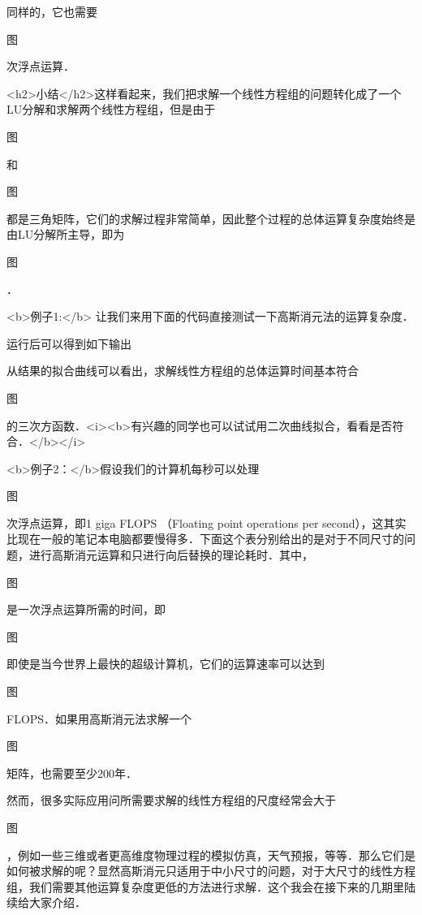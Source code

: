 同样的，它也需要

图

 次浮点运算．

<h2>小结</h2>这样看起来，我们把求解一个线性方程组的问题转化成了一个LU分解和求解两个线性方程组，但是由于

图

 和

图

 都是三角矩阵，它们的求解过程非常简单，因此整个过程的总体运算复杂度始终是由LU分解所主导，即为

图

 ．

<b>例子1:</b> 让我们来用下面的代码直接测试一下高斯消元法的运算复杂度．

运行后可以得到如下输出

从结果的拟合曲线可以看出，求解线性方程组的总体运算时间基本符合

图

 的三次方函数．<i><b>有兴趣的同学也可以试试用二次曲线拟合，看看是否符合．</b></i>

<b>例子2：</b>假设我们的计算机每秒可以处理

图

 次浮点运算，即1 giga FLOPS （Floating point operations per second），这其实比现在一般的笔记本电脑都要慢得多．下面这个表分别给出的是对于不同尺寸的问题，进行高斯消元运算和只进行向后替换的理论耗时．其中，

图

 是一次浮点运算所需的时间，即

图

 
即使是当今世界上最快的超级计算机，它们的运算速率可以达到

图

 FLOPS．如果用高斯消元法求解一个

图

 矩阵，也需要至少200年．

然而，很多实际应用问所需要求解的线性方程组的尺度经常会大于

图

 ，例如一些三维或者更高维度物理过程的模拟仿真，天气预报，等等．那么它们是如何被求解的呢？显然高斯消元只适用于中小尺寸的问题，对于大尺寸的线性方程组，我们需要其他运算复杂度更低的方法进行求解．这个我会在接下来的几期里陆续给大家介绍．
